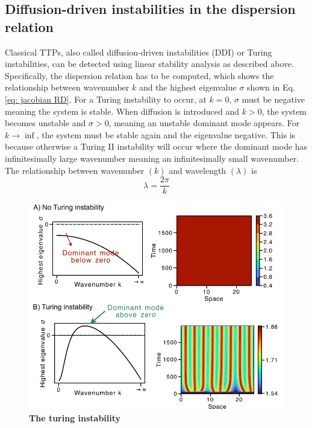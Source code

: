 \subsection{Diffusion-driven instabilities in the dispersion relation}
Classical TTPs, also called diffusion-driven instabilities (DDI) or Turing instabilities, can be detected using linear stability analysis as described above.
Specifically, the dispersion relation has to be computed, which shows the relationship between wavenumber $k$ and the highest eigenvalue $\sigma$ shown in Eq. \eqref{eq: jacobian RD}.
For a Turing instability to occur, at $k=0$, $\sigma$ must be negative meaning the system is stable.
When diffusion is introduced and $k>0$, the system becomes unstable and $\sigma>0$, meaning an unstable dominant mode appears.
For $k \rightarrow \inf$, the system must be stable again and the eigenvalue negative. This is because otherwise a Turing II instability will occur where the dominant mode has infinitesimally large wavenumber meaning an infinitesimally small wavenumber. The relationship between wavenunber $(k)$ and wavelength $(\lambda)$ is
\begin{equation}
    \lambda = \frac{2 \pi}{k}
\end{equation}
\begin{figure}[H] %
    \centering
    \includegraphics[width=1\textwidth]{chapters/Chapter 1/turing_vs_noturing} %
    \caption[\textbf{The turing instability}]{\textbf{The turing instability}}
    \label{fig:turing_vs_noturing} %
\end{figure}
